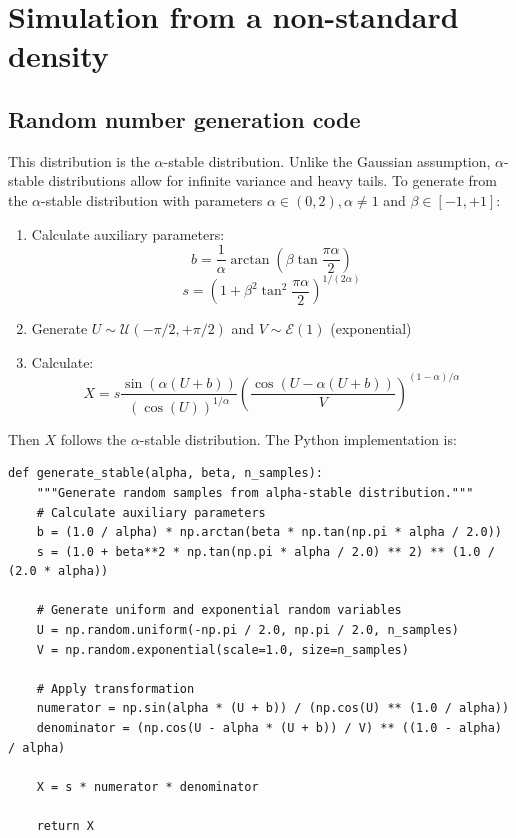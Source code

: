 \documentclass[12pt]{article}
\begin{document}
\section{Simulation from a non-standard density}

\subsection{Random number generation code}

This distribution is the $\alpha$-stable distribution. Unlike the Gaussian assumption, $\alpha$-stable distributions allow for infinite variance and heavy tails. To generate from the $\alpha$-stable distribution with parameters $\alpha \in (0,2), \alpha \neq 1$ and $\beta \in [-1,+1]$:

\begin{enumerate}
    \item Calculate auxiliary parameters:
          $$b = \frac{1}{\alpha}\arctan\left(\beta\tan\frac{\pi\alpha}{2}\right)$$
          $$s = \left(1 + \beta^2\tan^2\frac{\pi\alpha}{2}\right)^{1/(2\alpha)}$$

    \item Generate $U \sim \mathcal{U}(-\pi/2, +\pi/2)$ and $V \sim \mathcal{E}(1)$ (exponential)

    \item Calculate:
          $$X = s \frac{\sin(\alpha(U + b))}{(\cos(U))^{1/\alpha}}\left(\frac{\cos(U - \alpha(U + b))}{V}\right)^{(1-\alpha)/\alpha}$$
\end{enumerate}

Then $X$ follows the $\alpha$-stable distribution. The Python implementation is:

\begin{verbatim}
def generate_stable(alpha, beta, n_samples):
    """Generate random samples from alpha-stable distribution."""
    # Calculate auxiliary parameters
    b = (1.0 / alpha) * np.arctan(beta * np.tan(np.pi * alpha / 2.0))
    s = (1.0 + beta**2 * np.tan(np.pi * alpha / 2.0) ** 2) ** (1.0 / (2.0 * alpha))

    # Generate uniform and exponential random variables
    U = np.random.uniform(-np.pi / 2.0, np.pi / 2.0, n_samples)
    V = np.random.exponential(scale=1.0, size=n_samples)

    # Apply transformation
    numerator = np.sin(alpha * (U + b)) / (np.cos(U) ** (1.0 / alpha))
    denominator = (np.cos(U - alpha * (U + b)) / V) ** ((1.0 - alpha) / alpha)

    X = s * numerator * denominator

    return X
\end{verbatim}
\end{document}

